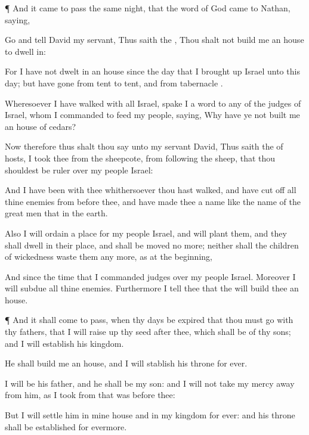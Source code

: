 {\par }{\PP {}¶ And it came to pass the same
night, that the
word of
God came to
Nathan,
saying,

Go and
tell
David my
servant, Thus
saith the
{}, Thou shalt not
build me an
house to dwell
in:

For I have not dwelt
in an
house since the
day that I brought
up
Israel unto this
day; but have gone from
tent to
tent, and from
{}
tabernacle
{}.

Wheresoever I have
walked with all
Israel,
spake I a
word to
any of the
judges of
Israel, whom I
commanded to
feed my
people,
saying, Why have ye not
built me an
house of
cedars?

Now therefore thus shalt thou
say unto my
servant
David, Thus
saith the
{} of
hosts, I
took thee from the
sheepcote,
{} from
following the
sheep, that thou shouldest be
ruler over my
people
Israel:

And I have been with thee whithersoever thou hast
walked, and have cut
off all thine
enemies from
before thee, and have
made thee a
name like the
name of the great
men that
{} in the
earth.

Also I will
ordain a
place for my
people
Israel, and will
plant them, and they shall
dwell in their place, and shall be
moved no more; neither shall the
children of
wickedness
waste them any
more, as at the
beginning,

And since the
time that I
commanded
judges
{} over my
people
Israel. Moreover I will
subdue all thine
enemies. Furthermore I
tell thee that the
{} will
build thee an
house.


\par }{\PP {}¶ And it shall come to pass, when thy
days be
expired that thou must
go
{} with thy
fathers, that I will raise
up thy
seed
after thee, which shall be of thy
sons; and I will
establish his
kingdom.

He shall
build me an
house, and I will
stablish his
throne
for
ever.

I will be his
father, and he shall be my
son: and I will not
take my
mercy
away from him, as I
took
{} from
{} that was
before thee:

But I will
settle him in mine
house and in my
kingdom for
ever: and his
throne shall be
established
for
evermore.

}

